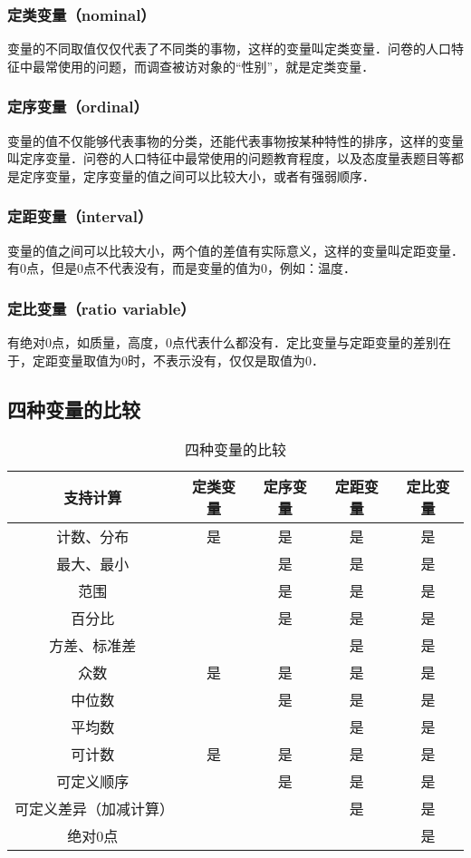 \subsubsection{定类变量（nominal）}
变量的不同取值仅仅代表了不同类的事物，这样的变量叫定类变量．问卷的人口特征中最常使用的问题，而调查被访对象的“性别”，就是定类变量．
\subsubsection{定序变量（ordinal）}
变量的值不仅能够代表事物的分类，还能代表事物按某种特性的排序，这样的变量叫定序变量．问卷的人口特征中最常使用的问题教育程度，以及态度量表题目等都是定序变量，定序变量的值之间可以比较大小，或者有强弱顺序．
\subsubsection{定距变量（interval）}
变量的值之间可以比较大小，两个值的差值有实际意义，这样的变量叫定距变量．有0点，但是0点不代表没有，而是变量的值为0，例如：温度．
\subsubsection{定比变量（ratio variable）}
有绝对0点，如质量，高度，0点代表什么都没有．定比变量与定距变量的差别在于，定距变量取值为0时，不表示没有，仅仅是取值为0．
\subsection{四种变量的比较}
\begin{table}[ht]
\centering
\caption{四种变量的比较}\label{DatTyp_tab1}
\begin{tabular}{|c|c|c|c|c|}
\hline
支持计算 & 定类变量 & 定序变量 & 定距变量 & 定比变量 \\
\hline
计数、分布 & 是 & 是 & 是 & 是 \\
\hline
最大、最小 &   & 是 & 是 & 是 \\
\hline
范围 &   & 是 & 是 & 是 \\
\hline
百分比 &   & 是 & 是 & 是 \\
\hline
方差、标准差 &   &   & 是 & 是 \\
\hline
众数 & 是 & 是 & 是 & 是 \\
\hline
中位数 &   & 是 & 是 & 是 \\
\hline
平均数 &   &   & 是 & 是 \\
\hline
可计数 & 是 & 是 & 是 & 是 \\
\hline
可定义顺序 &   & 是 & 是 & 是 \\
\hline
可定义差异（加减计算） &   &   & 是 & 是 \\
\hline
绝对0点 &   &   &   & 是 \\
\hline
\end{tabular}
\end{table}

